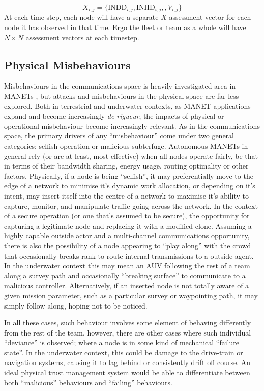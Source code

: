 \begin{equation}
  X_{i,j}=\{\text{INDD}_{i,j}, \text{INHD}_{i,j},, V_{i,j}\}
  \label{eq:phys_vector}
\end{equation}
At each time-step, each node will have a separate $X$ assessment vector for each node it has observed in that time. 
Ergo the fleet or team as a whole will have $N\times N$ assessment vectors at each timestep.

\subsection{Physical Misbehaviours}

Misbehaviours in the communications space is heavily investigated area in MANETs \cite{Konate2011}\cite{Wang2009}\cite{Chen2014a}\cite{Mitchell2014}, but attacks and misbehaviours in the physical space are far less explored. 
Both in terrestrial and underwater contexts, as MANET applications expand and become increasingly \emph{de rigueur}, the impacts of physical or operational misbehaviour become increasingly relevant. 
As in the communications space, the primary drivers of any ``misbehaviour'' come under two general categories; selfish operation or malicious subterfuge.
Autonomous MANETs in general rely (or are at least, most effective) when all nodes operate fairly, be that in terms of their bandwidth sharing, energy usage, routing optimality or other factors. 
Physically, if a node is being ``selfish'', it may preferentially move to the edge of a network to minimise it's dynamic work allocation, or depending on it's intent, may insert itself into the centre of a network to maximise it's ability to capture, monitor, and manipulate traffic going across the network. 
In the context of a secure operation (or one that's assumed to be secure), the opportunity for capturing a legitimate node and replacing it with a modified clone.
Assuming a highly capable outside actor and a multi-channel communications opportunity, there is also the possibility of a node appearing to ``play along'' with the crowd that occasionally breaks rank to route internal transmissions to a outside agent.
In the underwater context this may mean an AUV following the rest of a team along a survey path and occasionally ``breaking surface'' to communicate to a malicious controller.
Alternatively, if an inserted node is not totally aware of a given mission parameter, such as a particular survey or waypointing path, it may simply follow along, hoping not to be noticed.

In all these cases, such behaviour involves some element of behaving differently from the rest of the team, however, there are other cases where such individual ``deviance'' is observed; where a node is in some kind of mechanical ``failure state''.
In the underwater context, this could be damage to the drive-train or navigation systems, causing it to lag behind or consistently drift off course. 
An ideal physical trust management system would be able to differentiate between both ``malicious'' behaviours and ``failing'' behaviours.

